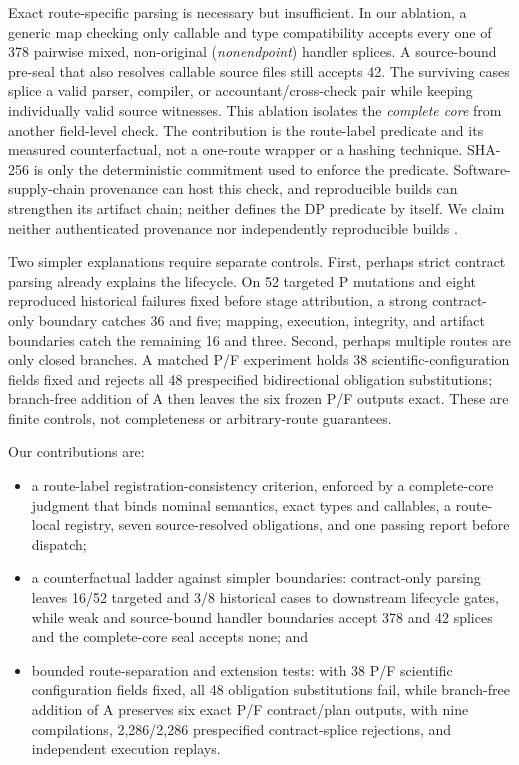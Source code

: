 \documentclass[letterpaper]{article}
\begin{document}
Exact route-specific parsing is necessary but insufficient.  In our ablation,
a generic map checking only callable and type compatibility accepts every one
of 378 pairwise mixed, non-original
(\emph{nonendpoint}) handler splices.  A source-bound pre-seal that also
resolves callable source files still accepts 42.  The surviving cases splice a
valid parser, compiler, or
accountant/cross-check pair while keeping individually valid source witnesses.
This ablation isolates the \emph{complete core} from another field-level check.
The contribution is the route-label predicate and its measured counterfactual,
not a one-route wrapper or a hashing technique.
SHA-256 is only the deterministic commitment used to enforce the predicate.
Software-supply-chain provenance can host this check, and reproducible builds
can strengthen its artifact chain; neither defines the DP predicate by itself.
We claim neither authenticated provenance nor independently reproducible
builds \citep{torresarias2019intoto,lamb2022reproducible}.

Two simpler explanations require separate controls.  First, perhaps strict
contract parsing already explains the lifecycle.  On 52 targeted P mutations
and eight reproduced historical failures fixed before stage attribution, a
strong contract-only boundary catches 36 and five; mapping, execution,
integrity, and artifact boundaries catch the remaining 16 and three.  Second,
perhaps multiple routes are only closed branches.  A matched P/F experiment
holds 38 scientific-configuration fields fixed and rejects all 48 prespecified
bidirectional obligation substitutions; branch-free addition of A then leaves
the six frozen P/F outputs exact.  These are finite controls, not completeness
or arbitrary-route guarantees.

Our contributions are:
\begin{itemize}
    \item a route-label registration-consistency criterion, enforced by a
    complete-core judgment that binds nominal semantics, exact types and
    callables, a route-local registry, seven source-resolved obligations, and
    one passing report before dispatch;
    \item a counterfactual ladder against simpler boundaries: contract-only
    parsing leaves 16/52 targeted and 3/8 historical cases to downstream
    lifecycle gates, while weak and source-bound handler boundaries accept 378
    and 42 splices and the complete-core seal accepts none; and
    \item bounded route-separation and extension tests: with 38 P/F scientific
    configuration fields fixed, all 48 obligation substitutions fail, while
    branch-free addition of A preserves six exact P/F contract/plan outputs,
    with nine compilations, 2,286/2,286 prespecified contract-splice rejections,
    and independent execution replays.
\end{itemize}
\end{document}
